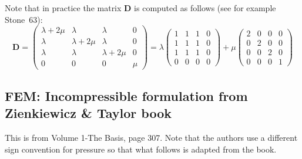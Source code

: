 

Note that in practice the matrix ${\bm D}$ is computed as follows (see for example Stone~63):
\[
{\bm D}
=
\left(
\begin{array}{cccc}
\lambda+2\mu & \lambda & \lambda & 0  \\
\lambda & \lambda+2\mu & \lambda & 0  \\
\lambda & \lambda & \lambda+2\mu & 0  \\
0 & 0 & 0 & \mu 
\end{array}
\right)
=
\lambda
\left(
\begin{array}{cccc}
1 & 1 & 1 & 0  \\
1 & 1 & 1 & 0  \\
1 & 1 & 1 & 0  \\
0 & 0 & 0 & 0 
\end{array}
\right)
+
\mu
\left(
\begin{array}{cccc}
2 & 0 & 0 & 0 \\
0 & 2 & 0 & 0 \\
0 & 0 & 2 & 0 \\
0 & 0 & 0 & 1  
\end{array}
\right)
\]




\newpage
\subsection{FEM: Incompressible formulation from Zienkiewicz \& Taylor book}

This is from Volume 1-The Basis, page 307. Note that the authors use a different sign convention for pressure so that what follows is adapted from the book.

